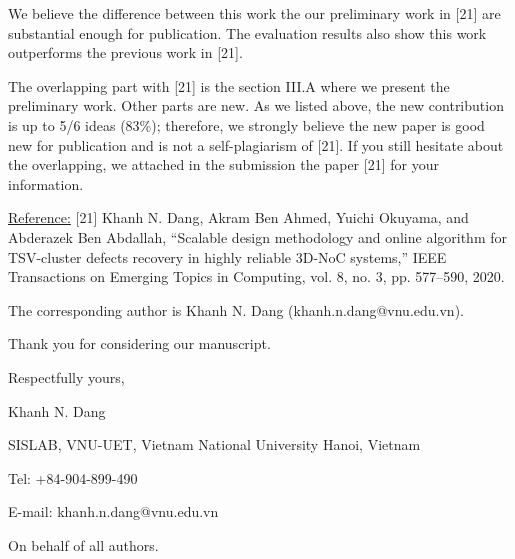 \documentclass[12pt]{article}
\begin{document}
\begin{sf}
\begin{itemize}
	
\end{itemize} 

We believe the difference between this work the our preliminary work in [21] are substantial enough for publication. The evaluation results also show this work outperforms the previous work in [21].

The overlapping part with [21] is the section III.A where we present the preliminary work. Other parts are new. As we listed above, the new contribution is up to 5/6 ideas (83\%); therefore, we strongly believe the new paper is good new for publication and is not a self-plagiarism of [21]. If you still hesitate about the overlapping, we attached in the submission the paper [21] for your information.

\vspace{.3cm}

\noindent
{\small  \underline{Reference:}  [21]  Khanh N. Dang, Akram Ben Ahmed, Yuichi Okuyama, and Abderazek Ben Abdallah, ``Scalable design methodology and online algorithm 	for TSV-cluster defects recovery in highly reliable 3D-NoC systems,''
	IEEE Transactions on Emerging Topics in Computing, vol. 8, no. 3, 	pp. 577–590, 2020.
}

\vspace{.3cm}


\vspace{.3cm}
\noindent
The corresponding author is Khanh N. Dang (khanh.n.dang@vnu.edu.vn).

\vspace{.3cm}
\noindent
Thank you for considering our manuscript. 

\vspace{.5cm}


\noindent 
Respectfully yours, 

\vspace{.1cm}
\noindent
Khanh N. Dang 

\vspace{.2cm}



\noindent
SISLAB, VNU-UET, Vietnam National University Hanoi, Vietnam

\noindent
Tel: +84-904-899-490 

\noindent
E-mail:   khanh.n.dang@vnu.edu.vn 

\vspace{.3cm}
\noindent
On behalf of all authors.
\pagebreak
\end{sf}
\end{document}
